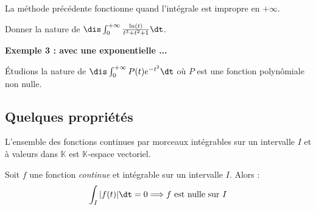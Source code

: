 \documentclass[a4paper,10pt]{report}
\begin{document}
\vspace{5cm}

\begin{att} La méthode précédente fonctionne quand l'intégrale est impropre en $+ \infty$.
\end{att}

\begin{exa} Donner la nature de $\dis \int_{0}^{+ \infty} \frac{\ln(t)}{t^3+t^2+1} \dt$.
\end{exa}

%
%
%
%
%
%
%
%
%

\medskip

\noindent \textbf{Exemple 3 : avec une exponentielle ...}

\noindent Étudions la nature de $\dis \int_{0}^{+ \infty} P(t) e^{-t^2} \dt$ où $P$ est une fonction polynômiale non nulle.

\vspace{6cm}


%

\subsection{Quelques propriétés}

\begin{thm} L'ensemble des fonctions continues par morceaux intégrables sur un intervalle $I$ et à valeurs dans $\mathbb{K}$ est $\mathbb{K}$-espace vectoriel.
\end{thm}

\begin{prop} Soit $f$ une fonction \textit{continue} et intégrable sur un intervalle $I$. Alors :
$$ \int_{I} \vert f(t) \vert \dt=0 \Longrightarrow f \hbox{ est nulle sur } I $$
\end{prop}
\end{document}
